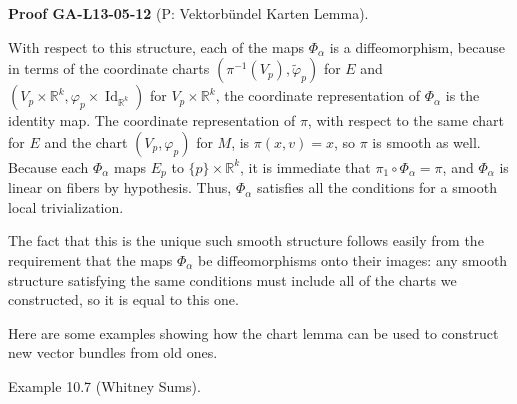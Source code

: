 \documentclass[10pt, letterpaper]{article}
\newcommand{\CustomHeading}[3]{%
  \par\medskip\noindent%
  \textbf{#1 #2} \textnormal{(#3)}.\enskip%
}
\newenvironment{PROOF}[2]{\begin{unitbox}\CustomHeading{Proof}{#1}{#2}}{\end{unitbox}}
\begin{document}
\begin{PROOF}{GA-L13-05-12}{P: Vektorbündel Karten Lemma}
With respect to this structure, each of the maps $\Phi_{\alpha}$ is a diffeomorphism, because in terms of the coordinate charts $\left(\pi^{-1}\left(V_{p}\right), \widetilde{\varphi}_{p}\right)$ for $E$ and $\left(V_{p} \times \mathbb{R}^{k}, \varphi_{p} \times \operatorname{Id}_{\mathbb{R}^{k}}\right)$ for $V_{p} \times \mathbb{R}^{k}$, the coordinate representation of $\Phi_{\alpha}$ is the identity map. The coordinate representation of $\pi$, with respect to the same chart for $E$ and the chart $\left(V_{p}, \varphi_{p}\right)$ for $M$, is $\pi(x, v)=x$, so $\pi$ is smooth as well. Because each $\Phi_{\alpha}$ maps $E_{p}$ to $\{p\} \times \mathbb{R}^{k}$, it is immediate that $\pi_{1} \circ \Phi_{\alpha}=\pi$, and $\Phi_{\alpha}$ is linear on fibers by hypothesis. Thus, $\Phi_{\alpha}$ satisfies all the conditions for a smooth local trivialization.

The fact that this is the unique such smooth structure follows easily from the requirement that the maps $\Phi_{\alpha}$ be diffeomorphisms onto their images: any smooth structure satisfying the same conditions must include all of the charts we constructed, so it is equal to this one.
\end{PROOF}



Here are some examples showing how the chart lemma can be used to construct new vector bundles from old ones.


Example 10.7 (Whitney Sums). 
\end{document}
